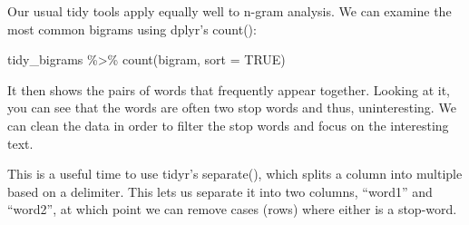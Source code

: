 \documentclass[
  letterpaper,
  DIV=11,
  numbers=noendperiod]{scrartcl}
\newenvironment{Shaded}{\begin{snugshade}}{\end{snugshade}}
\newcommand{\AttributeTok}[1]{\textcolor[rgb]{0.40,0.45,0.13}{#1}}
\newcommand{\CommentTok}[1]{\textcolor[rgb]{0.37,0.37,0.37}{#1}}
\newcommand{\ConstantTok}[1]{\textcolor[rgb]{0.56,0.35,0.01}{#1}}
\newcommand{\FunctionTok}[1]{\textcolor[rgb]{0.28,0.35,0.67}{#1}}
\newcommand{\NormalTok}[1]{\textcolor[rgb]{0.00,0.23,0.31}{#1}}
\newcommand{\OtherTok}[1]{\textcolor[rgb]{0.00,0.23,0.31}{#1}}
\newcommand{\SpecialCharTok}[1]{\textcolor[rgb]{0.37,0.37,0.37}{#1}}
\newcommand{\StringTok}[1]{\textcolor[rgb]{0.13,0.47,0.30}{#1}}
\begin{document}
Our usual tidy tools apply equally well to n-gram analysis. We can
examine the most common bigrams using dplyr's count():

\begin{Shaded}
\begin{Highlighting}[]
\NormalTok{tidy\_bigrams }\SpecialCharTok{\%\textgreater{}\%}
  \FunctionTok{count}\NormalTok{(bigram, }\AttributeTok{sort =} \ConstantTok{TRUE}\NormalTok{)}
\end{Highlighting}
\end{Shaded}

It then shows the pairs of words that frequently appear together.
Looking at it, you can see that the words are often two stop words and
thus, uninteresting. We can clean the data in order to filter the stop
words and focus on the interesting text.

This is a useful time to use tidyr's separate(), which splits a column
into multiple based on a delimiter. This lets us separate it into two
columns, ``word1'' and ``word2'', at which point we can remove cases
(rows) where either is a stop-word.

\begin{Shaded}
\end{Shaded}
\end{document}
